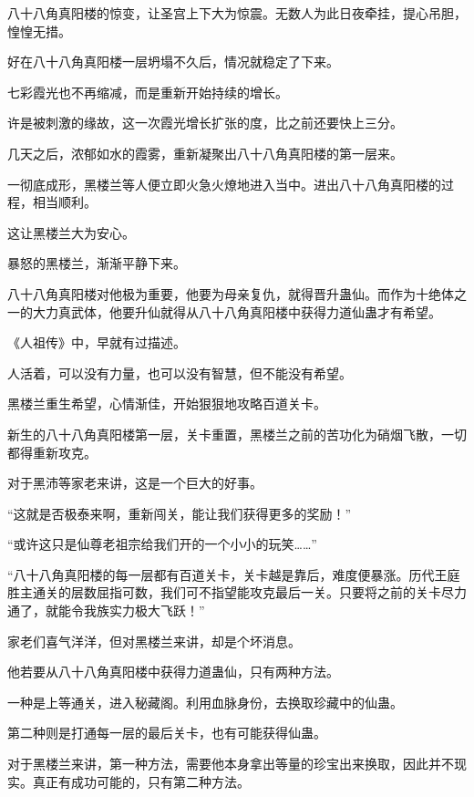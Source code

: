 
\begin{this_body}

八十八角真阳楼的惊变，让圣宫上下大为惊震。无数人为此日夜牵挂，提心吊胆，惶惶无措。

好在八十八角真阳楼一层坍塌不久后，情况就稳定了下来。

七彩霞光也不再缩减，而是重新开始持续的增长。

许是被刺激的缘故，这一次霞光增长扩张的度，比之前还要快上三分。

几天之后，浓郁如水的霞雾，重新凝聚出八十八角真阳楼的第一层来。

一彻底成形，黑楼兰等人便立即火急火燎地进入当中。进出八十八角真阳楼的过程，相当顺利。

这让黑楼兰大为安心。

暴怒的黑楼兰，渐渐平静下来。

八十八角真阳楼对他极为重要，他要为母亲复仇，就得晋升蛊仙。而作为十绝体之一的大力真武体，他要升仙就得从八十八角真阳楼中获得力道仙蛊才有希望。

《人祖传》中，早就有过描述。

人活着，可以没有力量，也可以没有智慧，但不能没有希望。

黑楼兰重生希望，心情渐佳，开始狠狠地攻略百道关卡。

新生的八十八角真阳楼第一层，关卡重置，黑楼兰之前的苦功化为硝烟飞散，一切都得重新攻克。

对于黑沛等家老来讲，这是一个巨大的好事。

“这就是否极泰来啊，重新闯关，能让我们获得更多的奖励！”

“或许这只是仙尊老祖宗给我们开的一个小小的玩笑……”

“八十八角真阳楼的每一层都有百道关卡，关卡越是靠后，难度便暴涨。历代王庭胜主通关的层数屈指可数，我们可不指望能攻克最后一关。只要将之前的关卡尽力通了，就能令我族实力极大飞跃！”

家老们喜气洋洋，但对黑楼兰来讲，却是个坏消息。

他若要从八十八角真阳楼中获得力道蛊仙，只有两种方法。

一种是上等通关，进入秘藏阁。利用血脉身份，去换取珍藏中的仙蛊。

第二种则是打通每一层的最后关卡，也有可能获得仙蛊。

对于黑楼兰来讲，第一种方法，需要他本身拿出等量的珍宝出来换取，因此并不现实。真正有成功可能的，只有第二种方法。


\end{this_body}
